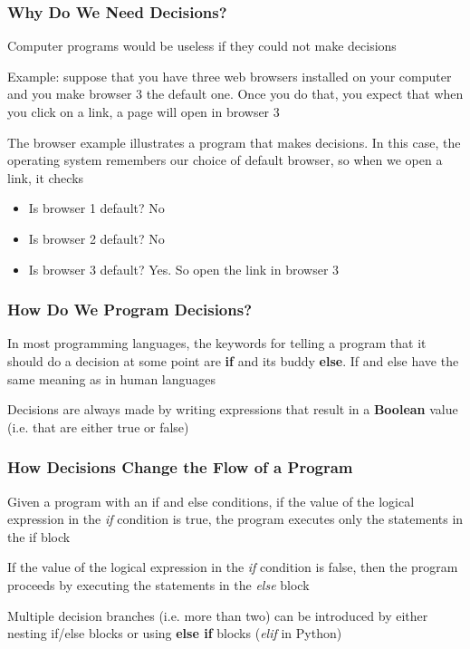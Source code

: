 \documentclass{beamer}
\begin{document}
\begin{frame}
\frametitle{Why Do We Need Decisions?}
    Computer programs would be useless if they could not make decisions
    \newline

    Example: suppose that you have three web browsers installed on your computer and you make browser 3 the default one. Once you do that, you expect that when you click on a link, a page will open in browser 3
    \newline

    The browser example illustrates a program that makes decisions. In this case, the operating system remembers our choice of default browser, so when we open a link, it checks
    \begin{itemize}
        \item Is browser 1 default? No
        \item Is browser 2 default? No
        \item Is browser 3 default? Yes. So open the link in browser 3
    \end{itemize}
\end{frame}

\begin{frame}
\frametitle{How Do We Program Decisions?}
    In most programming languages, the keywords for telling a program that it should do a decision at some point are \textbf{if} and its buddy \textbf{else}. If and else have the same meaning as in human languages
    \newline

    Decisions are always made by writing expressions that result in a \textbf{Boolean} value (i.e. that are either true or false)
    \vspace{0.25cm}
    
\end{frame}

\begin{frame}
\frametitle{How Decisions Change the Flow of a Program}
    Given a program with an if and else conditions, if the value of the logical expression in the \emph{if} condition is true, the program executes only the statements in the if block
    \newline

    If the value of the logical expression in the \emph{if} condition is false, then the program proceeds by executing the statements in the \emph{else} block
    \newline

    Multiple decision branches (i.e. more than two) can be introduced by either nesting if/else blocks or using \textbf{else if} blocks (\emph{elif} in Python)
\end{frame}
\end{document}
